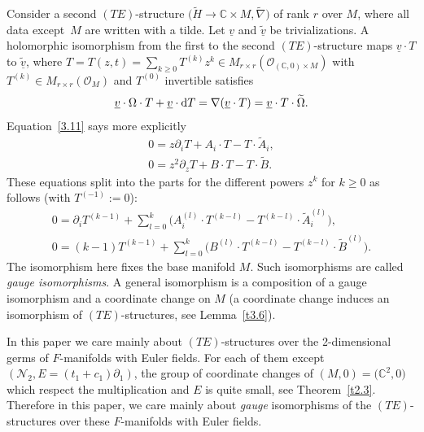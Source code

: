 \documentclass[pdftex]{sigma}%
\numberwithin{equation}{section}
\numberwithin{figure}{section}
\newcommand{\C}{{\mathbb C}}
\newcommand{\NN}{{\mathcal N}}
\newcommand{\OO}{{\mathcal O}}
\newcommand{\ddd}{{\rm d}}
\newcommand{\www}{\widetilde}
\newcommand{\uuuu}{\underline}
\newcommand{\paa}{\partial}
\newcommand{\nnn}{\nabla}
\begin{document}
\begin{Remark}
Consider a second $(TE)$-structure
$\big(\www H\to\C\times M,\www\nnn\big)$ of rank $r$ over $M$,
where all data except~$M$ are written with a tilde.
Let $\uuuu{v}$ and $\uuuu{\www v}$ be trivializations.
A holomorphic isomorphism from the first to the second
$(TE)$-structure maps $\uuuu{v}\cdot T$ to $\uuuu{\www v}$,
where
$T=T(z,t) =\sum_{k\geq 0}T^{(k)}z^k\in M_{r\times r}(\OO_{(\C,0)\times M})$
with $T^{(k)}\in M_{r\times r}(\OO_{M})$ and $T^{(0)}$
invertible satisfies
\begin{gather}\label{3.11}
\uuuu{v}\cdot\Omega\cdot T+\uuuu{v}\cdot\ddd T=
\nnn(\uuuu{v}\cdot T)=\uuuu{v}\cdot T\cdot\www\Omega.
\end{gather}
Equation~\eqref{3.11} says more explicitly
\begin{gather}\label{3.12}
0= z\paa_i T+A_i\cdot T-T\cdot\www A_i,
\\
0= z^2\paa_z T+B\cdot T-T\cdot \www B.\label{3.13}
\end{gather}
These equations split into the parts for the different
powers $z^k$ for $k\geq 0$ as follows (with $T^{(-1)}:=0$):
\begin{gather*}%
0= \paa_i T^{(k-1)}+\sum_{l=0}^k \big(A_i^{(l)}\cdot T^{(k-l)}
-T^{(k-l)}\cdot\www A_i^{(l)}\big),
\\
0= (k-1)T^{(k-1)}+\sum_{l=0}^k\big(B^{(l)}\cdot T^{(k-l)}
-T^{(k-l)}\cdot \www B^{(l)}\big).%
\end{gather*}
The isomorphism here fixes the base manifold $M$.
Such isomorphisms are called {\it gauge iso\-mor\-phisms}.
A general isomorphism is a composition of a
gauge isomorphism and a coordinate change on $M$
(a coordinate change induces an isomorphism of
$(TE)$-structures, see Lemma~\ref{t3.6}).
\end{Remark}

\begin{Remark}%
In this paper we care mainly about $(TE)$-structures
over the 2-dimensional germs of $F$-manifolds with
Euler fields. For each of them except
$(\NN_2,E=(t_1+c_1)\paa_1)$, the group of coordinate
changes of $(M,0)=\big(\C^2,0\big)$ which respect the multiplication
and $E$ is quite small, see Theorem~\ref{t2.3}.
Therefore in this paper, we care mainly about {\it gauge}
isomorphisms of the $(TE)$-structures over these
$F$-manifolds with Euler fields.
\end{Remark}
\end{document}
